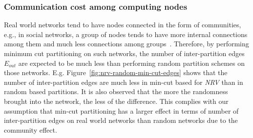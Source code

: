 \iffalse
\subsubsection{Communication cost among computing nodes}
\label{sec:exp:partition}

Real world networks tend to have nodes connected in the form of communities,
e.g., in social networks, a group of nodes tends to have more internal
connections among them and much less connections among groups~\cite{girvan2002community}.
Therefore, by performing minimum cut partitioning on such
networks, the number of inter-partition edges $E_{out}$ are expected to be much less than
performing random partition schemes on those networks. E.g. Figure~\ref{fig:nrv-random-min-cut-edges}
shows that the number of inter-partition edges are
much less in min-cut based for \textit{NRV} than in random based
partitions. It is also observed that the more the randomness brought into the
network, the less of the difference. This complies with our assumption that
min-cut partitioning has a larger effect in terms of number of inter-partition
edges on real world networks than random networks due to the community effect.

